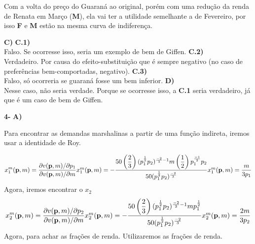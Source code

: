 \documentclass[a4paper, 12pt]{article} %
\begin{document}
\begin{flushleft}
\begin{center}
\end{center}

Com a volta do preço do Guaraná ao original, porém com uma redução da renda de Renata em Março (\textbf{M}), ela vai ter a utilidade semelhante a de Fevereiro, por isso \textbf{F} e \textbf{M} estão na mesma curva de indiferença. 

\singlespacing

\textbf{C)} 
\singlespacing
\textbf{C.1)}
\\
Falso. Se ocorresse isso, seria um exemplo de bem de Giffen.
\singlespacing
\textbf{C.2)}
\\
Verdadeiro. Por causa do efeito-substituição que é sempre negativo (no caso de preferências bem-comportadas, negativo).
\singlespacing
\textbf{C.3)}
\\
Falso, só ocorreria se guaraná fosse um bem inferior.
\singlespacing
\textbf{D)}
\\
Nesse caso, não seria verdade. Porque se ocorresse isso, a \textbf{C.1} seria verdadeiro, já que é um caso de bem de Giffen. 
\singlespacing

\textbf{4-}
\singlespacing
\textbf{A)}
\singlespacing

Para encontrar as demandas marshalinas a partir de uma função indireta, iremos usar a identidade de Roy.

\begin{equation}
x_{1}^{m}(\textbf{p},m) = \dfrac{ \partial v(\textbf{p},m) / \partial p_{1}}{\partial v(\textbf{p},m)/\partial m}
$$\\$$
x_{1}^{m}(\textbf{p},m) = - \dfrac{ 50 \left(\dfrac{2}{3}\right)(p_{1}^{\frac{1}{2}}p_{2})^{\frac{-2}{3}-1}m\left(\dfrac{1}{2}\right)p_{1}^{\frac{-1}{2}}p_{2}}{50(p_{1}^{\frac{1}{2}}{p_{2}})^{\frac{-2}{3}}}
$$\\$$
x_{1}^{m}(\textbf{p},m) = \dfrac{m}{3p_{1}}
\end{equation}
Agora, iremos encontrar o $x_{2}$
\begin{equation}
x_{2}^{m}(\textbf{p},m) = \dfrac{ \partial v(\textbf{p},m) / \partial p_{2}}{\partial v(\textbf{p},m)/\partial m}
$$\\$$
x_{2}^{m}(\textbf{p},m) = - \dfrac{50 \left(\dfrac{2}{3} \right) (p_{1}^{\frac{1}{2}}p_{2})^{\frac{-2}{3}-1} mp_{1}^{\frac{1}{2}} }{50(p_{1}^{\frac{1}{2}}p_{2})^{\frac{-2}{3}}}
$$\\$$
x_{2}^{m}(\textbf{p},m) = \dfrac{2m}{3p_{2}}
\end{equation}
Agora, para achar as frações de renda. Utilizaremos as frações de renda.


\end{flushleft}
\end{document}
